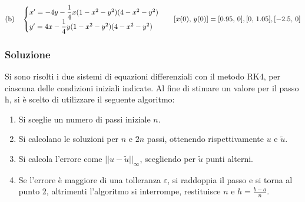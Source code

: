 \documentclass[letterpaper, 12pt]{article}
\numberwithin{equation}{section}    %
\begin{document}
\begin{align*}
\text{(b)}\quad 
\begin{cases}
x' = -4y - \dfrac{1}{4}x(1 - x^2 - y^2)(4 - x^2 - y^2) \\
y' = 4x - \dfrac{1}{4}y(1 - x^2 - y^2)(4 - x^2 - y^2)
\end{cases}
\hspace{0.3cm}
[x(0),\, y(0)] = [0.95,\, 0], [0,\, 1.05], [-2.5,\, 0]
\end{align*}

\subsubsection{Soluzione}
Si sono risolti i due sistemi di equazioni differenziali con il metodo RK4, per ciascuna delle condizioni iniziali
indicate. Al fine di stimare un valore per il passo h, si è scelto di utilizzare il seguente algoritmo:
\begin{enumerate}
    \item Si sceglie un numero di passi iniziale $n$.
    \item Si calcolano le soluzioni per $n$ e $2n$ passi, ottenendo rispettivamente $u$ e $\tilde{u}$.
    \item Si calcola l'errore come $||u - \tilde{u}||_\infty$, scegliendo per $\tilde{u}$ punti alterni.
    \item Se l'errore è maggiore di una tolleranza $\varepsilon$, si raddoppia il passo e si torna al punto 2,
    altrimenti l'algoritmo si interrompe, restituisce $n$ e $h = \frac{b-a}{n}$.
\end{enumerate}
\end{document}

